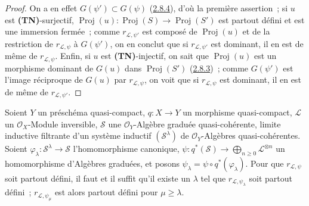 \begin{proof}
On a en effet $G(\psi')\subset G(\psi)$
(\hyperref[II.2.8.4-fr]{2.8.4}), d'où la première assertion~; si $u$ est
\textbf{(TN)}-surjectif,
$\operatorname{Proj}(u):\operatorname{Proj}(S)\to
\operatorname{Proj}(S')$ est partout défini et est une immersion
fermée~; comme $r_{\mathcal{L},\psi'}$ est composé de
$\operatorname{Proj}(u)$ et de la restriction de $r_{\mathcal{L},\psi}$ à
$G(\psi')$, on en conclut que si $r_{\mathcal{L},\psi'}$ est dominant, il en
est de même de $r_{\mathcal{L},\psi}$. Enfin, si $u$ est
\textbf{(TN)}-injectif, on sait que $\operatorname{Proj}(u)$ est un morphisme
dominant de $G(u)$ dans $\operatorname{Proj}(S')$
(\hyperref[II.2.8.3-fr]{2.8.3})~; comme $G(\psi')$ est l'image réciproque de
$G(u)$ par $r_{\mathcal{L},\psi}$, on voit que si $r_{\mathcal{L},\psi}$ est
dominant, il en est de même de $r_{\mathcal{L},\psi'}$.
\end{proof}

\begin{proposition}[3.7.7]
\label{II.3.7.7-fr}
Soient $Y$ un préschéma quasi-compact, $q:X\to Y$ un morphisme quasi-compact,
$\mathcal{L}$ un $\mathcal{O}_X$-Module inversible, $\mathcal{S}$ une
$\mathcal{O}_Y$-Algèbre graduée quasi-cohérente, limite inductive filtrante
d'un système inductif $(\mathcal{S}^\lambda)$ de $\mathcal{O}_Y$-Algèbres
quasi-cohérentes. Soient
$\varphi_\lambda:\mathcal{S}^\lambda\to\mathcal{S}$ l'homomorphisme
canonique,
$\psi:q^*(\mathcal{S})\to\bigoplus_{n\geq0}\mathcal{L}^{\otimes n}$ un
homomorphisme d'Algèbres graduées, et posons
$\psi_\lambda=\psi\circ q^*(\varphi_\lambda)$. Pour que
$r_{\mathcal{L},\psi}$ soit partout défini, il faut et il suffit qu'il existe
un $\lambda$ tel que $r_{\mathcal{L},\psi_\lambda}$ soit partout défini~;
$r_{\mathcal{L},\psi_\mu}$ est alors partout défini pour $\mu\geq\lambda$.
\end{proposition}

